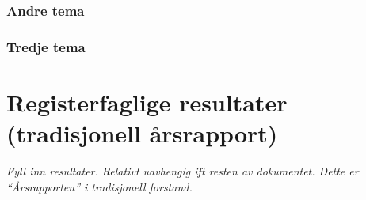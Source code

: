 \documentclass[norsk, a4paper, twocolumn]{report}
\begin{document}
\section{Andre tema}
\section{Tredje tema}



\part{Registerfaglige resultater (tradisjonell årsrapport)}\label{part:res}

\textit{Fyll inn resultater. Relativt uavhengig ift resten av dokumentet. Dette
er ``Årsrapporten'' i tradisjonell forstand.}





\listoftables
\end{document}
